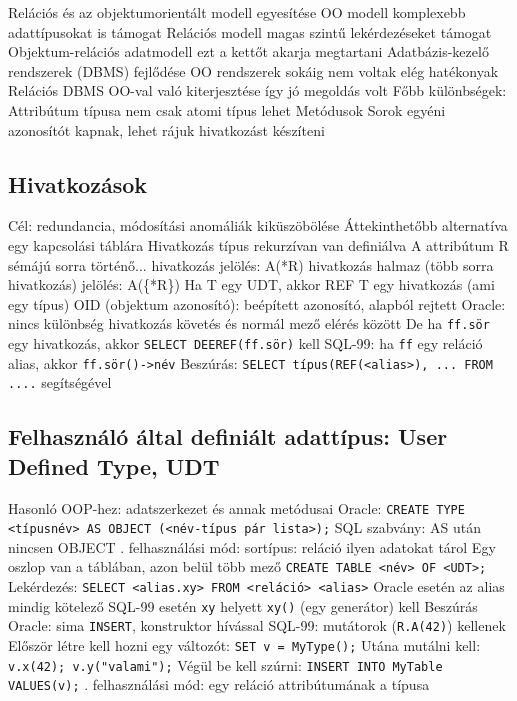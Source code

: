 \documentclass[12pt,a4paper]{article}
\begin{document}
\begin{outline}
	\1 Relációs és az objektumorientált modell egyesítése
		\2 OO modell komplexebb adattípusokat is támogat
		\2 Relációs modell magas szintű lekérdezéseket támogat
		\2 Objektum-relációs adatmodell ezt a kettőt akarja megtartani
	\1 Adatbázis-kezelő rendszerek (DBMS) fejlődése
		\2 OO rendszerek sokáig nem voltak elég hatékonyak
		\2 Relációs DBMS OO-val való kiterjesztése így jó megoldás volt
	\1 Főbb különbségek:
		\2 Attribútum típusa nem csak atomi típus lehet
		\2 Metódusok
		\2 Sorok egyéni azonosítót kapnak, lehet rájuk hivatkozást készíteni
\end{outline}

\subsection{Hivatkozások}

\begin{outline}
	\1 Cél: redundancia, módosítási anomáliák kiküszöbölése
		\2 Áttekinthetőbb alternatíva egy kapcsolási táblára
	\1 Hivatkozás típus rekurzívan van definiálva
	\1 A attribútum R sémájú sorra történő...
		\2 hivatkozás jelölés: A(*R)
		\2 hivatkozás halmaz (több sorra hivatkozás) jelölés: A(\{*R\})
	\1 Ha T egy UDT, akkor REF T egy hivatkozás (ami egy típus)
	\1 OID (objektum azonosító): beépített azonosító, alapból rejtett
	\1 Oracle: nincs különbség hivatkozás követés és normál mező elérés között
		\2 De ha \texttt{ff.sör} egy hivatkozás, akkor \texttt{SELECT DEEREF(ff.sör)} kell
	\1 SQL-99: ha \texttt{ff} egy reláció alias, akkor \texttt{ff.sör()->név}
	\1 Beszúrás: \texttt{SELECT típus(REF(<alias>), ... FROM ....} segítségével
\end{outline}

\subsection{Felhasználó által definiált adattípus: User Defined Type, UDT}

\begin{outline}
	\1 Hasonló OOP-hez: adatszerkezet és annak metódusai
	\1 Oracle: \texttt{CREATE TYPE <típusnév> AS OBJECT (<név-típus pár lista>);}
		\2 SQL szabvány: AS után nincsen OBJECT
	. felhasználási mód: sortípus: reláció ilyen adatokat tárol
		\2 Egy oszlop van a táblában, azon belül több mező
		\2 \texttt{CREATE TABLE <név> OF <UDT>;}
		\2 Lekérdezés: \texttt{SELECT <alias.xy> FROM <reláció> <alias>}
			\3 Oracle esetén az alias mindig kötelező
			\3 SQL-99 esetén \texttt{xy} helyett \texttt{xy()} (egy generátor) kell
		\2 Beszúrás
			\3 Oracle: sima \texttt{INSERT}, konstruktor hívással
			\3 SQL-99: mutátorok (\texttt{R.A(42)}) kellenek
				\4 Először létre kell hozni egy változót: \texttt{SET v = MyType();}
				\4 Utána mutálni kell: \texttt{v.x(42); v.y("valami");}
				\4 Végül be kell szúrni: \texttt{INSERT INTO MyTable VALUES(v);}
	. felhasználási mód: egy reláció attribútumának a típusa
\end{outline}
\end{document}

